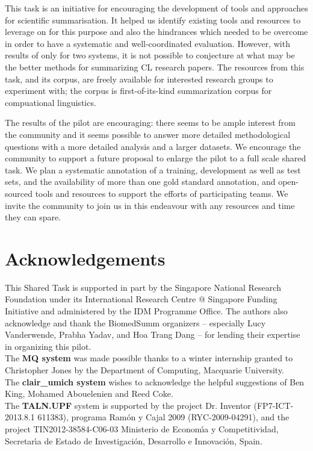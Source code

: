 \documentclass[11pt]{article}
\begin{document}
This task is an initiative for encouraging the development of tools and 
approaches for scientific summarisation. It helped us identify 
existing tools and resources to leverage on for this purpose
and also the hindrances which needed to be overcome in order to have a 
systematic and well-coordinated evaluation. However, with results of 
only for two systems, it is not possible to conjecture at what may be the 
better methods for summarizing CL research papers. The 
resources from this task, and its corpus, are freely available 
for interested research groups to experiment with; the corpus is 
first-of-its-kind summarization corpus for compuational linguistics.

The results of the pilot are encouraging: there seems to be ample
interest from the community and it seems possible to answer more
detailed methodological questions with a more detailed analysis and a
larger datasets.  We encourage the community to support a future
proposal to enlarge the pilot to a full scale shared task.  We plan a
systematic annotation of a training, development as well as test sets,
and the availability of more than one gold standard annotation, and
open-sourced tools and resources to support the efforts of
participating teams. We invite the community to join us in this
endeavour with any resources and time they can spare.



\section{Acknowledgements}
 This Shared Task is supported in part by the Singapore National
 Research Foundation under its International Research Centre @
 Singapore Funding Initiative and administered by the IDM Programme
 Office.  The authors also acknowledge and thank the BiomedSumm
 organizers -- especially Lucy Vanderwende, Prabha Yadav, and Hoa
 Trang Dang -- for lending their expertise in organizing this pilot.\\
 The {\bf MQ system} was made possible thanks to a winter internship
 granted to Christopher Jones by the Department of Computing,
 Macquarie University. \\ The {\bf clair\_umich system} wishes to
 acknowledge the helpful suggestions of Ben King, Mohamed Abouelenien
 and Reed Coke. \\ The {\bf TALN.UPF} system is supported by the
 project Dr. Inventor (FP7-ICT-2013.8.1 611383), programa Ram\'on y
 Cajal 2009 (RYC-2009-04291), and the project TIN2012-38584-C06-03
 Ministerio de Econom\'{\i}a y Competitividad, Secretar\'{\i}a de
 Estado de Investigaci\'on, Desarrollo e Innovaci\'on, Spain.


\end{document}
